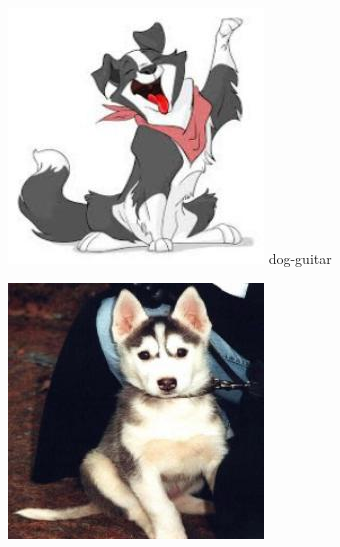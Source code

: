 \documentclass{article}
\begin{document}
\begin{center}
\begin{minipage}{0.142\textwidth}
        \includegraphics[width=\linewidth]{./pic/misclassified_r0_p3_2723.jpg}
        dog-guitar
    \end{minipage}%
    \begin{minipage}{0.142\textwidth}
        \includegraphics[width=\linewidth]{./pic/misclassified_r0_p6_2723.jpg}

\end{minipage}
\end{center}
\end{document}
